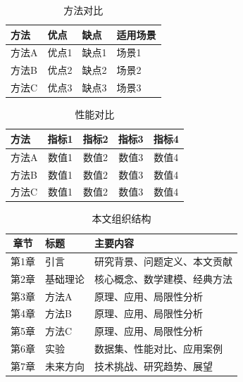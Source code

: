 
\begin{table}[htbp]
\centering
\caption{方法对比}
\label{tab:comparison}
\begin{tabular}{@{}llll@{}}
\toprule
\textbf{方法} & \textbf{优点} & \textbf{缺点} & \textbf{适用场景} \\
\midrule
方法A & 优点1 & 缺点1 & 场景1 \\
方法B & 优点2 & 缺点2 & 场景2 \\
方法C & 优点3 & 缺点3 & 场景3 \\
\bottomrule
\end{tabular}
\end{table}

\begin{table}[htbp]
\centering
\caption{性能对比}
\label{tab:performance}
\begin{tabular}{@{}lcccc@{}}
\toprule
\textbf{方法} & \textbf{指标1} & \textbf{指标2} & \textbf{指标3} & \textbf{指标4} \\
\midrule
方法A & 数值1 & 数值2 & 数值3 & 数值4 \\
方法B & 数值1 & 数值2 & 数值3 & 数值4 \\
方法C & 数值1 & 数值2 & 数值3 & 数值4 \\
\bottomrule
\end{tabular}
\end{table}

\begin{table}[htbp]
\centering
\caption{本文组织结构}
\label{tab:structure}
\begin{tabular}{@{}clp{8cm}@{}}
\toprule
\textbf{章节} & \textbf{标题} & \textbf{主要内容} \\
\midrule
第1章 & 引言 & 研究背景、问题定义、本文贡献 \\
第2章 & 基础理论 & 核心概念、数学建模、经典方法 \\
第3章 & 方法A & 原理、应用、局限性分析 \\
第4章 & 方法B & 原理、应用、局限性分析 \\
第5章 & 方法C & 原理、应用、局限性分析 \\
第6章 & 实验 & 数据集、性能对比、应用案例 \\
第7章 & 未来方向 & 技术挑战、研究趋势、展望 \\
\bottomrule
\end{tabular}
\end{table}

